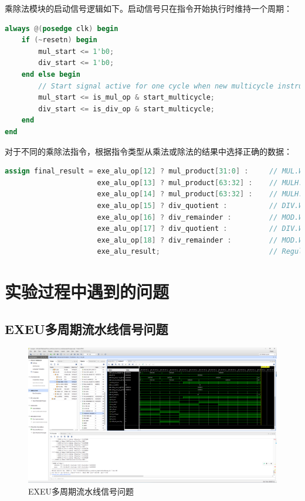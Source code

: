 \documentclass[11pt]{article}
\begin{document}
乘除法模块的启动信号逻辑如下。启动信号只在指令开始执行时维持一个周期：

\begin{lstlisting}[language=verilog]
always @(posedge clk) begin
    if (~resetn) begin
        mul_start <= 1'b0;
        div_start <= 1'b0;
    end else begin
        // Start signal active for one cycle when new multicycle instruction arrives
        mul_start <= is_mul_op & start_multicycle;
        div_start <= is_div_op & start_multicycle;
    end
end
\end{lstlisting}

对于不同的乘除法指令，根据指令类型从乘法或除法的结果中选择正确的数据：

\begin{lstlisting}[language=verilog]
assign final_result = exe_alu_op[12] ? mul_product[31:0] :     // MUL.W: low 32 bits
                      exe_alu_op[13] ? mul_product[63:32] :    // MULH.W: high 32 bits (signed)
                      exe_alu_op[14] ? mul_product[63:32] :    // MULH.WU: high 32 bits (unsigned)
                      exe_alu_op[15] ? div_quotient :          // DIV.W: quotient (signed)
                      exe_alu_op[16] ? div_remainder :         // MOD.W: remainder (signed)
                      exe_alu_op[17] ? div_quotient :          // DIV.WU: quotient (unsigned)
                      exe_alu_op[18] ? div_remainder :         // MOD.WU: remainder (unsigned)
                      exe_alu_result;                          // Regular ALU result
\end{lstlisting}

\section{实验过程中遇到的问题}

\subsection{EXEU多周期流水线信号问题}

\begin{figure}[H]
  \centering
  \includegraphics[width=\textwidth]{fig/exeu_multicycle_error.png}
  \caption{EXEU多周期流水线信号问题}
  \label{fig:exeu_multicycle_error}
\end{figure}
\end{document}
